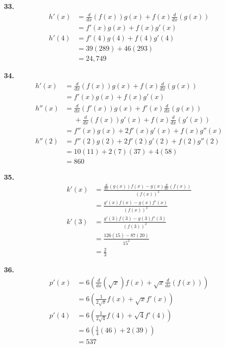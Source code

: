 \documentclass[10pt,oneside,]{book}
\theoremstyle{plain}
\theoremstyle{definition}
\numberwithin{equation}{section}
\newcommand{\fe}[2]{#1\mathopen{}\left(#2\right)\mathclose{}}
\newcommand{\fd}[1]{#1'}
\newcommand{\sd}[1]{#1''}
\newcommand{\lzoo}[2]{{\frac{d}{d#1}}{\left(#2\right)}}
\begin{document}
\par\smallskip
\noindent\textbf{33.}\quad{}\begin{align*}
\fe{\fd{h}}{x}&=\lzoo{x}{\fe{f}{x}}\fe{g}{x}+\fe{f}{x}\lzoo{x}{\fe{g}{x}}\\
&=\fe{\fd{f}}{x}\fe{g}{x}+\fe{f}{x}\fe{\fd{g}}{x}\\
\fe{\fd{h}}{4}&=\fe{\fd{f}}{4}\fe{g}{4}+\fe{f}{4}\fe{\fd{g}}{4}\\
&=39(289)+46(293)\\
&=24{,}749
\end{align*}%
\par\smallskip
\noindent\textbf{34.}\quad{}\begin{align*}
\fe{\fd{h}}{x}&=\lzoo{x}{\fe{f}{x}}\fe{g}{x}+\fe{f}{x}\lzoo{x}{\fe{g}{x}}\\
&=\fe{\fd{f}}{x}\fe{g}{x}+\fe{f}{x}\fe{\fd{g}}{x}\\
\fe{\sd{h}}{x}&=\lzoo{x}{\fe{\fd{f}}{x}}\fe{g}{x}+\fe{\fd{f}}{x}\lzoo{x}{\fe{g}{x}}\\
&\phantom{{}={}}{}+\lzoo{x}{\fe{f}{x}}\fe{\fd{g}}{x}+\fe{f}{x}\lzoo{x}{\fe{\fd{g}}{x}}\\
&=\fe{\sd{f}}{x}\fe{g}{x}+2\fe{\fd{f}}{x}\fe{\fd{g}}{x}+\fe{f}{x}\fe{\sd{g}}{x}\\
\fe{\sd{h}}{2}&=\fe{\sd{f}}{2}\fe{g}{2}+2\fe{\fd{f}}{2}\fe{\fd{g}}{2}+\fe{f}{2}\fe{\sd{g}}{2}\\
&=10(11)+2(7)(37)+4(58)\\
&=860
\end{align*}%
\par\smallskip
\noindent\textbf{35.}\quad{}\begin{align*}
\fe{\fd{k}}{x}&=\frac{\lzoo{x}{\fe{g}{x}}\fe{f}{x}-\fe{g}{x}\lzoo{x}{\fe{f}{x}}}{(\fe{f}{x})^2}\\
&=\frac{\fe{\fd{g}}{x}\fe{f}{x}-\fe{g}{x}\fe{\fd{f}}{x}}{(\fe{f}{x})^2}\\
\fe{\fd{k}}{3}&=\frac{\fe{\fd{g}}{3}\fe{f}{3}-\fe{g}{3}\fe{\fd{f}}{3}}{(\fe{f}{3})^2}\\
&=\frac{126(15)-87(20)}{15^2}\\
&=\frac{2}{3}
\end{align*}%
\par\smallskip
\noindent\textbf{36.}\quad{}\begin{align*}
\fe{\fd{p}}{x}&=6\left(\lzoo{x}{\sqrt{x}}\fe{f}{x}+\sqrt{x}\lzoo{x}{\fe{f}{x}}\right)\\
&=6\left(\frac{1}{2\sqrt{x}}\fe{f}{x}+\sqrt{x}\fe{\fd{f}}{x}\right)\\
\fe{\fd{p}}{4}&=6\left(\frac{1}{2\sqrt{4}}\fe{f}{4}+\sqrt{4}\fe{\fd{f}}{4}\right)\\
&=6\left(\frac{1}{4}(46)+2(39)\right)\\
&=537
\end{align*}%
\end{document}
